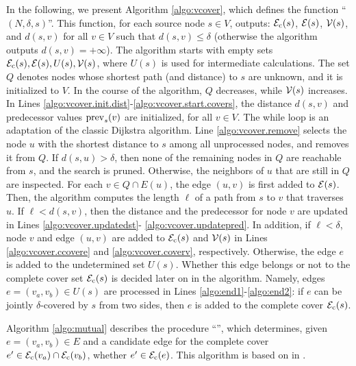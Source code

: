 In the following, we present Algorithm \ref{algo:vcover}, which defines the function ``\ncalgo{}$(N,\delta,s)$''. This function, for each source node $s \in V$, outputs: ${\mathcal E}_{\mathrm{c}}(s)$, ${\mathcal E}(s)$,  $\mathcal V(s)$,
and $d(s,v)$ for all $v\in V$ such that $d(s,v)\leq \delta$ (otherwise the algorithm outputs $d(s,v)=+\infty$). The algorithm  starts with empty sets ${\mathcal E}_{\mathrm{c}}(s), {\mathcal E}(s), U(s), \mathcal V(s)$, where $U(s)$ is used for intermediate calculations. The set $Q$ denotes nodes whose shortest path (and distance) to $s$ are unknown, and it is initialized to $V$. In the course of the algorithm, $Q$ decreases, while $\mathcal V(s)$ increases. In Lines \ref{algo:vcover.init.dist}-\ref{algo:vcover.start.covers}, the distance $d(s,v)$ and predecessor values $\operatorname{prev}_s(v)$ are initialized, for all $v\in V$. The while loop is an adaptation of the classic Dijkstra algorithm. Line \ref{algo:vcover.remove} selects the node $u$ with the shortest distance to $s$ among all unprocessed nodes, and removes it from $Q$.  If $d(s,u) > \delta$, then none of the remaining nodes in $Q$ are reachable from $s$, and the search is pruned. Otherwise, the neighbors of $u$ that are still in $Q$ are inspected. For each $v\in Q\cap E(u)$, the edge $(u,v)$ is first added to ${\mathcal E}(s)$. Then, the algorithm computes the length $\ell$ of a path from $s$ to $v$ that traverses $u$. If $\ell < d(s,v)$, then the distance and the predecessor for node $v$ are updated in Lines \ref{algo:vcover.updatedst}- \ref{algo:vcover.updatepred}. In addition, if $\ell < \delta$,  node $v$ and edge $(u,v)$ are added to ${\mathcal E}_{\mathrm{c}}(s)$ and $\mathcal V(s)$ in Lines \ref{algo:vcover.ccovere} and \ref{algo:vcover.coverv}, respectively.  Otherwise, the edge $e$ is added to the undetermined set $U(s)$. Whether this edge belongs or not to the complete cover set ${\mathcal E}_{\mathrm{c}}(s)$ is decided later on in the algorithm. Namely,  edges $e=(v_a, v_b)\in U(s)$ are processed in Lines \ref{algo:end1}-\ref{algo:end2}:  if $e$ can be jointly $\delta$-covered  by $s$ from two sides, then $e$ is added to the complete cover ${\mathcal E}_{\mathrm{c}}(s)$.

Algorithm \ref{algo:mutual} describes the procedure ``\malgo'', which determines, given $e=(v_a,v_b)\in E$ and a candidate edge for the complete cover $e'\in {\mathcal E}_{\mathrm{c}}(v_a)\cap{\mathcal E}_{\mathrm{c}}(v_b)$, whether $e' \in {\mathcal E}_{\mathrm{c}}(e)$. This algorithm is based on  in .

